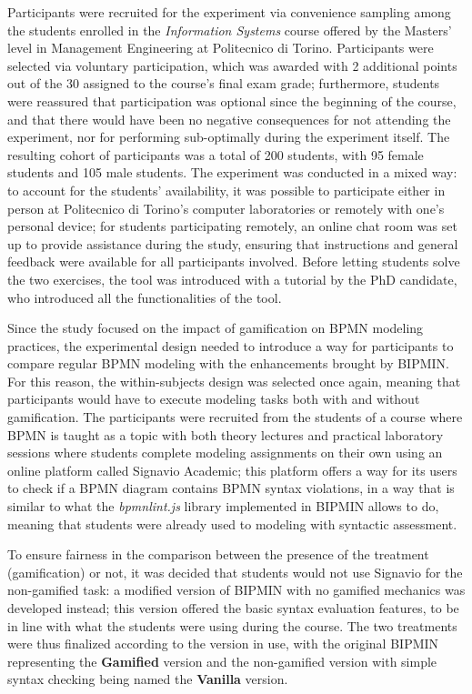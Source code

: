 Participants were recruited for the experiment via convenience sampling among the students enrolled in the \textit{Information Systems} course offered by the Masters' level in Management Engineering at Politecnico di Torino. Participants were selected via voluntary participation, which was awarded with 2 additional points out of the 30 assigned to the course's final exam grade; furthermore, students were reassured that participation was optional since the beginning of the course, and that there would have been no negative consequences for not attending the experiment, nor for performing sub-optimally during the experiment itself. The resulting cohort of participants was a total of 200 students, with 95 female students and 105 male students. The experiment was conducted in a mixed way: to account for the students' availability, it was possible to participate either in person at Politecnico di Torino's computer laboratories or remotely with one's personal device; for students participating remotely, an online chat room was set up to provide assistance during the study, ensuring that instructions and general feedback were available for all participants involved. Before letting students solve the two exercises, the tool was introduced with a tutorial by the PhD candidate, who introduced all the functionalities of the tool.

Since the study focused on the impact of gamification on BPMN modeling practices, the experimental design needed to introduce a way for participants to compare regular BPMN modeling with the enhancements brought by BIPMIN. For this reason, the within-subjects design was selected once again, meaning that participants would have to execute modeling tasks both with and without gamification. The participants were recruited from the students of a course where BPMN is taught as a topic with both theory lectures and practical laboratory sessions where students complete modeling assignments on their own using an online platform called Signavio Academic; this platform offers a way for its users to check if a BPMN diagram contains BPMN syntax violations, in a way that is similar to what the \textit{bpmnlint.js} library implemented in BIPMIN allows to do, meaning that students were already used to modeling with syntactic assessment.

To ensure fairness in the comparison between the presence of the treatment (gamification) or not, it was decided that students would not use Signavio for the non-gamified task: a modified version of BIPMIN with no gamified mechanics was developed instead; this version offered the basic syntax evaluation features, to be in line with what the students were using during the course. The two treatments were thus finalized according to the version in use, with the original BIPMIN representing the \textbf{Gamified} version and the non-gamified version with simple syntax checking being named the \textbf{Vanilla} version.

